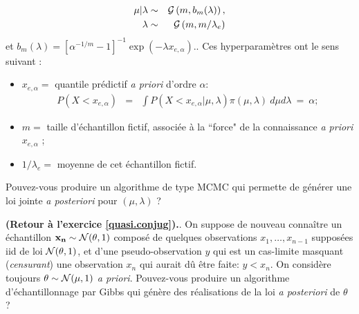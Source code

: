 \documentclass[10pt]{article}
\begin{document}
\begin{exec}
\begin{enumerate}
\begin{eqnarray*}
\mu|\lambda & \sim   & {\cal{G}}\left(m,b_m(\lambda) \right),  \\
\lambda    & \sim   & {\cal{G}}\left(m,m/\lambda_e\right)
\end{eqnarray*}
et ${\displaystyle b_m(\lambda)  = \left[\alpha^{-1/m}
-1\right]^{-1} \exp(-\lambda x_{e,\alpha}).}$. Ces hyperparamètres ont le sens suivant :
\begin{itemize}
\item $x_{e,\alpha}=$ quantile prédictif {\it a priori} d'ordre $\alpha$:
\begin{eqnarray*}
P\left(X<x_{e,\alpha}\right) & = & \int P\left(X<x_{e,\alpha}|\mu,\lambda\right)  \pi(\mu,\lambda) \ d\mu d\lambda \ = \ \alpha ; 
\end{eqnarray*}  
\item $m =$ taille d'échantillon fictif, associée à la ``force" de la connaissance {\it a priori} $x_{e,\alpha}$ ; 
\item $1/\lambda_e = $ moyenne de cet échantillon  fictif. 
\end{itemize}
Pouvez-vous produire un algorithme de type MCMC qui permette de générer une loi jointe {\it a posteriori} pour $(\mu,\lambda)$ ? 
\end{enumerate}
\end{exec}

 
\fi

\if{} \vspace{1cm}
\begin{exec}{\bf (Retour à l'exercice \ref{quasi.conjug}).}. 
 On suppose de nouveau connaître un échantillon ${\bf x_n} \sim {\cal{N}}(\theta,1)$ composé de quelques observations $x_1,\ldots,x_{n-1}$ supposées iid de loi ${\cal{N}}(\theta,1)$, et d'une  pseudo-observation $y$ qui est un cas-limite masquant ({\it censurant}) une observation $x_{n}$ qui aurait dû être faite: $y<x_{n}$. On considère toujours $\theta \sim {\cal{N}}(\mu,1)$ {\it a priori}. 
Pouvez-vous produire un algorithme d'échantillonnage par Gibbs qui génère des réalisations de la loi {\it a posteriori} de $\theta$ ? 
\end{exec}

 
\fi
\end{document}
